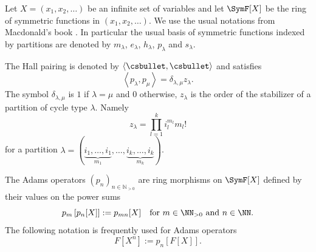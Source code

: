 \begin{notations}
Let $X=(x_1,x_2,\dots)$ be an infinite set of variables and let $\SymF[X]$ be the ring of symmetric functions in $(x_1,x_2,\dots)$. We use the usual notations from Macdonald's book \cite{Macdonald}. In particular the usual basis of symmetric functions indexed by partitions are denoted by $m_{\lambda}$, $e_{\lambda}$, $h_{\lambda}$, $p_{\lambda}$ and $s_{\lambda}$.

The Hall pairing is denoted by $\langle\csbullet,\csbullet\rangle$ and satisfies
\begin{equation}\label{orthp}
\left\langle p_\lambda,p_\mu\right\rangle =\delta_{\lambda,\mu}z_\lambda.
\end{equation}
The symbol $\delta_{\lambda,\mu}$ is $1$ if $\lambda=\mu$ and $0$ otherwise, $z_\lambda$ is the order of the stabilizer of a partition of cycle type $\lambda$. Namely
\begin{equation*}
z_\lambda=\prod_{l=1}^k i_l^{m_{l}}m_{l}!
\end{equation*}
for a partition $\lambda=(\underbrace{i_1,\dots,i_1}_{m_{1}},\dots,\underbrace{i_k,\dots,i_k}_{m_{k}})$.
\end{notations}

\begin{definition}
The Adams operators $(p_n)_{n\in\mathbb{N}_{>0}}$ are ring morphisms on $\SymF[X]$ defined by their values on the power sums
\[
p_m\left[p_n[X]\right]:=p_{mn}[X]\quad\text{for } m \in \NN_{>0} \text{ and } n \in \NN.
\]
The following notation is frequently used for Adams operators
\[
F\left[X^n\right]:=p_n\left[F[X]\right].
\]
\end{definition}

